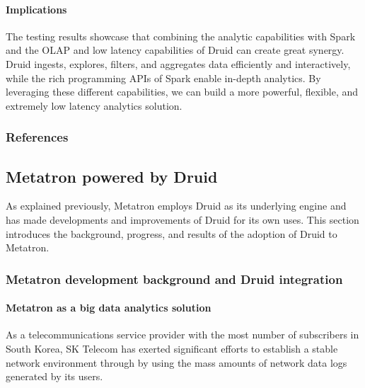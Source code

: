 \documentclass[letterpaper,10pt,english]{sphinxmanual}
\begin{document}
\paragraph{Implications}
\label{\detokenize{discovery/part01/druid_tests:id11}}
The testing results showcase that combining the analytic capabilities with Spark and the OLAP and low latency capabilities of Druid can create great synergy. Druid ingests, explores, filters, and aggregates data efficiently and interactively, while the rich programming APIs of Spark enable in-depth analytics. By leveraging these different capabilities, we can build a more powerful, flexible, and extremely low latency analytics solution.
\subsubsection*{References}


\subsection{Metatron powered by Druid}
\label{\detokenize{discovery/part01/druid_to_metatron:metatron-druid}}\label{\detokenize{discovery/part01/druid_to_metatron::doc}}
As explained previously, Metatron employs Druid as its underlying engine and has made developments and improvements of Druid for its own uses. This section introduces the background, progress, and results of the adoption of Druid to Metatron.


\subsubsection{Metatron development background and Druid integration}
\label{\detokenize{discovery/part01/druid_to_metatron:id1}}

\paragraph{Metatron as a big data analytics solution}
\label{\detokenize{discovery/part01/druid_to_metatron:metatron}}
As a telecommunications service provider with the most number of subscribers in South Korea, SK Telecom has exerted significant efforts to establish a stable network environment through by using the mass amounts of network data logs generated by its users.
\end{document}
